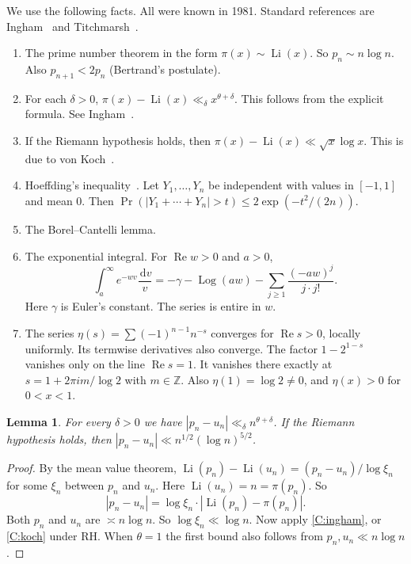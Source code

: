\documentclass[12pt,letterpaper]{article}
\newtheorem{lemma}[theorem]{Lemma}
\theoremstyle{definition}
\theoremstyle{remark}
\newcommand{\Li}{\operatorname{Li}}
\newcommand{\Log}{\operatorname{Log}}
\newcommand{\Ree}{\operatorname{Re}}
\newcommand{\dd}{\,\mathrm{d}}
\begin{document}
We use the following facts. All were known in 1981. Standard references
are Ingham~\cite{In32} and Titchmarsh~\cite{Ti51}.
\begin{enumerate}[label=(C\arabic*),leftmargin=3em]
\item\label{C:pnt} The prime number theorem in the form
  $\pi(x)\sim\Li(x)$. So $p_n\sim n\log n$. Also $p_{n+1}<2p_n$
  (Bertrand's postulate).
\item\label{C:ingham} For each $\delta>0$,
  $\pi(x)-\Li(x)\ll_\delta x^{\theta+\delta}$. This follows from the
  explicit formula. See Ingham~\cite{In32}.
\item\label{C:koch} If the Riemann hypothesis holds, then
  $\pi(x)-\Li(x)\ll\sqrt{x}\log x$. This is due to von
  Koch~\cite{vK01}.
\item\label{C:hoeffding} Hoeffding's inequality~\cite{Ho63}. Let
  $Y_1,\dots,Y_n$ be independent with values in $[-1,1]$ and mean $0$.
  Then $\Pr(|Y_1+\cdots+Y_n|>t)\le 2\exp(-t^2/(2n))$.
\item\label{C:BC} The Borel--Cantelli lemma.
\item\label{C:E1} The exponential integral. For $\Ree w>0$ and $a>0$,
  \[
  \int_a^\infty e^{-wv}\frac{\dd v}{v}
  =-\gamma-\Log(aw)-\sum_{j\ge1}\frac{(-aw)^j}{j\cdot j!}.
  \]
  Here $\gamma$ is Euler's constant. The series is entire in $w$.
\item\label{C:eta} The series $\eta(s)=\sum(-1)^{n-1}n^{-s}$ converges
  for $\Ree s>0$, locally uniformly. Its termwise derivatives also
  converge. The factor $1-2^{1-s}$ vanishes only on the line $\Ree s=1$.
  It vanishes there exactly at $s=1+2\pi i m/\log2$ with $m\in\mathbb Z$.
  Also $\eta(1)=\log 2\ne0$, and $\eta(x)>0$ for $0<x<1$.
\end{enumerate}

\begin{lemma}\label{lem:pnun}
For every $\delta>0$ we have $|p_n-u_n|\ll_\delta n^{\theta+\delta}$. If
the Riemann hypothesis holds, then $|p_n-u_n|\ll n^{1/2}(\log n)^{5/2}$.
\end{lemma}

\begin{proof}
By the mean value theorem,
$\Li(p_n)-\Li(u_n)=(p_n-u_n)/\log\xi_n$ for some $\xi_n$ between $p_n$
and $u_n$. Here $\Li(u_n)=n=\pi(p_n)$. So
\[
|p_n-u_n|=\log\xi_n\cdot|\Li(p_n)-\pi(p_n)|.
\]
Both $p_n$ and $u_n$ are $\asymp n\log n$. So $\log\xi_n\ll\log n$. Now
apply \ref{C:ingham}, or \ref{C:koch} under RH. When $\theta=1$ the first
bound also follows from $p_n,u_n\ll n\log n$.
\end{proof}
\end{document}
